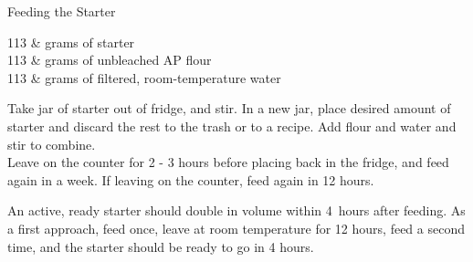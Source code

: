 \setHeadlines
{
}

\begin{recipe}
[ %
    source = Jim (and the rest of the internet),
]
{Feeding the Starter}

    \ingredients
    {
		113 & grams of starter \\
		113 & grams of unbleached AP flour \\
		113 & grams of filtered, room-temperature water \\
    }
    
    \preparation
    {
        \step Take jar of starter out of fridge, and stir. In a new jar, place desired amount of starter and discard the rest to the trash or to a recipe. 
		\step Add flour and water and stir to combine. \\
		\step Leave on the counter for 2 - 3 hours before placing back in the fridge, and feed again in a week. If leaving on the counter, feed again in 12 hours. 
    }
	
	\suggestion
	{
		An active, ready starter should double in volume within 4~hours after feeding. As a first approach, feed once, leave at room temperature for 12 hours, feed a second time, and the starter should be ready to go in 4 hours.
	}

\end{recipe}
